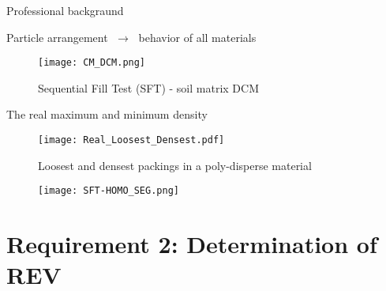 \documentclass[10pt,xcolor=dvipsnames]{beamer}
\begin{document}
{\begin{frame}{Professional backgraund}
%
%


\begin{frame}[fragile]{Particle arrangement $\;\longrightarrow\;$  behavior of all materials}
\begin{figure}[H]
   \centering
     \texttt{[image: CM\_DCM.png]}
        \caption{Sequential Fill Test (SFT) - soil matrix DCM}
        \label{fig:EXP-SFT1}
\end{figure}

\end{frame}




{
\usenavigationsymbolstemplate{}

%
%

\begin{frame}[fragile]{The real maximum and minimum density}
\begin{figure}[H]
\texttt{[image: Real\_Loosest\_Densest.pdf]} 
\vspace{-0.2cm}      
 \caption{Loosest and densest packings in a poly-disperse material}
        \label{fig:loosedense}
\end{figure}
\end{frame}

{
\usenavigationsymbolstemplate{}

\begin{frame}%
	\begin{figure}[H]
\texttt{[image: SFT-HOMO\_SEG.png]}      
        \label{fig:SFT_Homo_Seg}
\end{figure}
\end{frame}
}

}

{
\usenavigationsymbolstemplate{}
%
%
\section{Requirement 2: Determination of REV}
}
{

}
\end{frame}}
\end{document}
